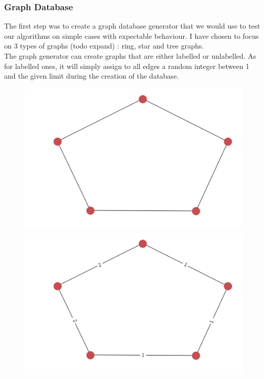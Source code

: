\documentclass{article}
\theoremstyle{definition}
\begin{document}
\subsubsection{Graph Database}
The first step was to create a graph database generator that we would use to test our algorithms on simple cases with expectable behaviour. I have chosen to focus on 3 types of graphs (todo expand) : ring, star and tree graphs.\\
The graph generator can create graphs that are either labelled or unlabelled. As for labelled ones, it will simply assign to all edges a random integer between 1 and the given limit during the creation of the database.
\begin{figure}[!htb]
\begin{multicols}{4}
    \includegraphics[width=\linewidth]{data/generated-graphs/ring_base.png}\par
    \includegraphics[width=\linewidth]{data/generated-graphs/ring_labels.png}\par

\end{multicols}
\end{figure}
\end{document}
